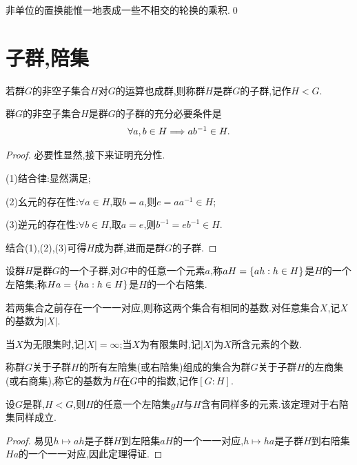 \begin{proposition}
    非单位的置换能惟一地表成一些不相交的轮换的乘积.\qed
\end{proposition}
\section{子群,陪集}
\begin{definition}[子群]
    若群$G$的非空子集合$H$对$G$的运算也成群,则称群$H$是群$G$的子群,记作$H<G$.
\end{definition}
\begin{theorem}\label{p31dl1}
    群$G$的非空子集合$H$是群$G$的子群的充分必要条件是\begin{align*}
        \forall a,b\in H\Longrightarrow ab^{-1}\in H.
    \end{align*}
\end{theorem}
\begin{proof}
    必要性显然,接下来证明充分性.

    (1)结合律:显然满足;

    (2)幺元的存在性:$\forall a\in H$,取$b=a$,则$e=aa^{-1}\in H$;

    (3)逆元的存在性:$\forall b\in H$,取$a=e$,则$b^{-1}=eb^{-1}\in H$.

    结合(1),(2),(3)可得$H$成为群,进而是群$G$的子群.
\end{proof}
\begin{definition}
    设群$H$是群$G$的一个子群,对$G$中的任意一个元素$a$,称$aH=\left\{ah:h\in H\right\}$是$H$的一个左陪集;称$Ha=\left\{ha:h\in H\right\}$是$H$的一个右陪集.
\end{definition}
\begin{definition}[基数]\label{ju}
    若两集合之前存在一个一一对应,则称这两个集合有相同的基数.对任意集合$X$,记$X$的基数为$|X|$.

    当$X$为无限集时,记$|X|=\infty$;当$X$为有限集时,记$|X|$为$X$所含元素的个数.
\end{definition}
\begin{definition}[商集,指数]\label{uj}\label{vs}
    称群$G$关于子群$H$的所有左陪集(或右陪集)组成的集合为群$G$关于子群$H$的左商集(或右商集),称它的基数为$H$在$G$中的指数,记作$[G:H]$.
\end{definition}
\begin{theorem}\label{vu1}
    设$G$是群,$H<G$,则$H$的任意一个左陪集$gH$与$H$含有同样多的元素.该定理对于右陪集同样成立.
\end{theorem}
\begin{proof}
    易见$h\mapsto ah$是子群$H$到左陪集$aH$的一个一一对应,$h\mapsto ha$是子群$H$到右陪集$Ha$的一个一一对应,因此定理得证.
\end{proof}
